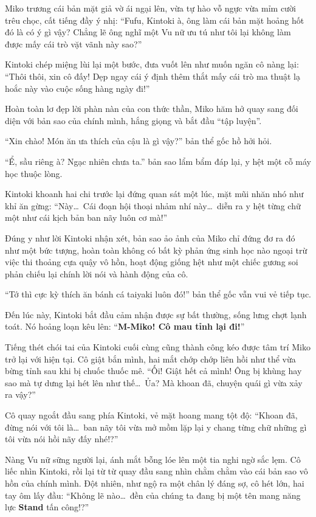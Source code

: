 \documentclass[../main.tex]{subfiles}
\begin{document}
Miko trương cái bản mặt giả vờ ái ngại lên, vừa tự hào vỗ ngực vừa mỉm cười trêu chọc, cất tiếng đầy ý nhị: ``Fufu, Kintoki à, ông làm cái bản mặt hoảng hốt đó là có ý gì vậy? Chẳng lẽ ông nghĩ một Vu nữ ưu tú như tôi lại không làm được mấy cái trò vặt vãnh này sao?''

Kintoki chép miệng lùi lại một bước, đưa vuốt lên như muốn ngăn cô nàng lại: ``Thôi thôi, xin cô đấy! Dẹp ngay cái ý định thêm thắt mấy cái trò ma thuật lạ hoắc này vào cuộc sống hàng ngày đi!''

Hoàn toàn lơ đẹp lời phàn nàn của con thức thần, Miko hăm hở quay sang đối diện với bản sao của chính mình, hắng giọng và bắt đầu ``tập luyện''.


``Xin chào! Món ăn ưa thích của cậu là gì vậy?'' bản thể gốc hồ hởi hỏi.

``Ể, sầu riêng à? Ngạc nhiên chưa ta.'' bản sao lẩm bẩm đáp lại, y hệt một cỗ máy học thuộc lòng.

Kintoki khoanh hai chi trước lại đứng quan sát một lúc, mặt mũi nhăn nhó như khỉ ăn gừng: ``Này\dots\ Cái đoạn hội thoại nhảm nhí này\dots\ diễn ra y hệt từng chữ một như cái kịch bản ban nãy luôn cơ mà!''

Đúng y như lời Kintoki nhận xét, bản sao ảo ảnh của Miko chỉ đứng đơ ra đó như một bức tượng, hoàn toàn không có bất kỳ phản ứng sinh học nào ngoại trừ việc thi thoảng cựa quậy vô hồn, hoạt động giống hệt như một chiếc gương soi phản chiếu lại chính lời nói và hành động của cô.

``Tớ thì cực kỳ thích ăn bánh cá taiyaki luôn đó!'' bản thể gốc vẫn vui vẻ tiếp tục.

Đến lúc này, Kintoki bắt đầu cảm nhận được sự bất thường, sống lưng chợt lạnh toát. Nó hoảng loạn kêu lên: ``\textbf{M-Miko! Cô mau tỉnh lại đi!}''

Tiếng thét chói tai của Kintoki cuối cùng cũng thành công kéo được tâm trí Miko trở lại với hiện tại. Cô giật bắn mình, hai mắt chớp chớp liên hồi như thể vừa bừng tỉnh sau khi bị chuốc thuốc mê. ``Ối! Giật hết cả mình! Ông bị khùng hay sao mà tự dưng lại hét lên như thế\dots\ Ủa? Mà khoan đã, chuyện quái gì vừa xảy ra vậy?''

Cô quay ngoắt đầu sang phía Kintoki, vẻ mặt hoang mang tột độ: ``Khoan đã, đừng nói với tôi là\dots\ ban nãy tôi vừa mở mồm lặp lại y chang từng chữ những gì tôi vừa nói hồi nãy đấy nhé!?''

Nàng Vu nữ sững người lại, ánh mắt bỗng lóe lên một tia nghi ngờ sắc lẹm. Cô liếc nhìn Kintoki, rồi lại từ từ quay đầu sang nhìn chằm chằm vào cái bản sao vô hồn của chính mình. Đột nhiên, như ngộ ra một chân lý đáng sợ, cô hét lớn, hai tay ôm lấy đầu: ``Không lẽ nào\dots\ đền của chúng ta đang bị một tên mang năng lực \textbf{Stand} tấn công!?''
\end{document}
